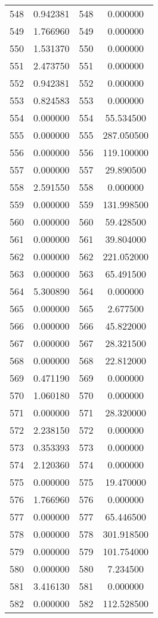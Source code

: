 \documentclass[12pt]{article}
\begin{document}
\begin{longtable}{@{}cccc@{}}
548 & 0.942381 & 548 & 0.000000 \\
549 & 1.766960 & 549 & 0.000000 \\
550 & 1.531370 & 550 & 0.000000 \\
551 & 2.473750 & 551 & 0.000000 \\
552 & 0.942381 & 552 & 0.000000 \\
553 & 0.824583 & 553 & 0.000000 \\
554 & 0.000000 & 554 & 55.534500 \\
555 & 0.000000 & 555 & 287.050500 \\
556 & 0.000000 & 556 & 119.100000 \\
557 & 0.000000 & 557 & 29.890500 \\
558 & 2.591550 & 558 & 0.000000 \\
559 & 0.000000 & 559 & 131.998500 \\
560 & 0.000000 & 560 & 59.428500 \\
561 & 0.000000 & 561 & 39.804000 \\
562 & 0.000000 & 562 & 221.052000 \\
563 & 0.000000 & 563 & 65.491500 \\
564 & 5.300890 & 564 & 0.000000 \\
565 & 0.000000 & 565 & 2.677500 \\
566 & 0.000000 & 566 & 45.822000 \\
567 & 0.000000 & 567 & 28.321500 \\
568 & 0.000000 & 568 & 22.812000 \\
569 & 0.471190 & 569 & 0.000000 \\
570 & 1.060180 & 570 & 0.000000 \\
571 & 0.000000 & 571 & 28.320000 \\
572 & 2.238150 & 572 & 0.000000 \\
573 & 0.353393 & 573 & 0.000000 \\
574 & 2.120360 & 574 & 0.000000 \\
575 & 0.000000 & 575 & 19.470000 \\
576 & 1.766960 & 576 & 0.000000 \\
577 & 0.000000 & 577 & 65.446500 \\
578 & 0.000000 & 578 & 301.918500 \\
579 & 0.000000 & 579 & 101.754000 \\
580 & 0.000000 & 580 & 7.234500 \\
581 & 3.416130 & 581 & 0.000000 \\
582 & 0.000000 & 582 & 112.528500 \\

\end{longtable}
\end{document}
